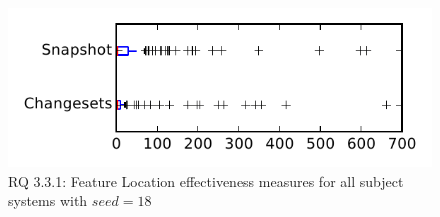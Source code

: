 
\begin{figure}
\centering
\includegraphics[height=0.4\textheight]{figures/flt_seed/rq1_tiny_18}
\caption{RQ 3.3.1: Feature Location effectiveness measures for all subject systems with $seed=18$}
\label{fig:flt_seed:rq1:tiny}
\end{figure}

